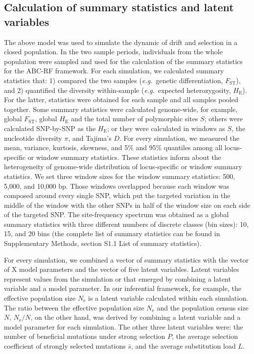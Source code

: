 \documentclass[a4paper, 12pt]{article}
\begin{document}
\subsection*{Calculation of summary statistics and latent variables}

The above model was used to simulate the dynamic of drift and selection in a closed population. In the two sample periods, individuals from the whole population were sampled and used for the calculation of the summary statistics for the ABC-RF framework. For each simulation, we calculated summary statistics that: 1) compared the two samples (\textit{e.g.}\ genetic differentiation, $F_{\mathrm{ST}}$), and 2) quantified the diversity within-sample (\textit{e.g.}\ expected heterozygosity, $H_{\mathrm{E}}$). For the latter, statistics were obtained for each sample and all samples pooled together. Some summary statistics were calculated genome-wide, for example, global $F_{\mathrm{ST}}$, global $H_{\mathrm{E}}$ and the total number of polymorphic sites $S$; others were calculated SNP-by-SNP as the $H_{\mathrm{E}}$; or they were calculated in windows as $S$, the nucleotide diversity $\pi$, and Tajima's $D$. For every simulation, we measured the mean, variance, kurtosis, skewness, and 5\% and 95\% quantiles among all locus-specific or window summary statistics. These statistics inform about the heterogeneity of genome-wide distribution of locus-specific or window summary statistics. We set three window sizes for the window summary statistics: 500, 5,000, and 10,000 bp. Those windows overlapped because each window was composed around every single SNP, which put the targeted variation in the middle of the window with the other SNPs in half of the window size on each side of the targeted SNP. The site-frequency spectrum was obtained as a global summary statistics with three different numbers of discrete classes (bin sizes): 10, 15, and 20 bins (the complete list of summary statistics can be found in Supplementary Methods, section S1.1 List of summary statistics).

For every simulation, we combined a vector of summary statistics with the vector of X model parameters and the vector of five latent variables. Latent variables represent values from the simulation or that emerged by combining a latent variable and a model parameter. In our inferential framework, for example, the effective population size $N_{\mathrm{e}}$ is a latent variable calculated within each simulation. The ratio between the effective population size $N_{\mathrm{e}}$ and the population census size $N$, $N_{\mathrm{e}}/N$, on the other hand, was derived by combining a latent variable and a model parameter for each simulation. The other three latent variables were: the number of beneficial mutations under strong selection $P$, the average selection coefficient of strongly selected mutations $\bar{s}$, and the average substitution load $L$.
\end{document}
